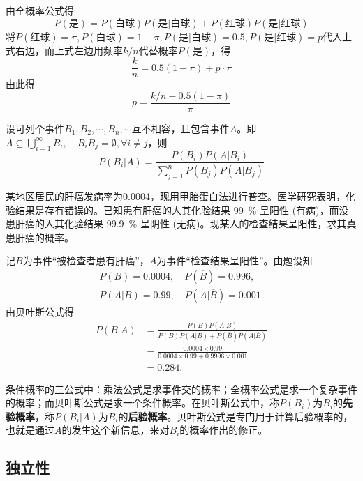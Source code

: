 由全概率公式得
\[ P(\text{是}) = P(\text{白球}) P(\text{是} | \text{白球}) + P(\text{红球}) P(\text{是} | \text{红球}) \]
将$P(\text{红球}) = \pi, P(\text{白球}) = 1-\pi, P(\text{是} | \text{白球}) = 0.5, P(\text{是} | \text{红球}) = p$代入上式右边，而上式左边用频率$k/n$代替概率$P (\text{是})$，得
\[ \frac{k}{n} = 0.5 (1 - \pi) + p \cdot \pi \]
由此得
\[ p = \frac{k/n - 0.5(1 - \pi)}{\pi} \]

\begin{theorem}[Bayes定理]\label{thm:Bayes_Theorem}
    设可列个事件$B_1, B_2, \cdots, B_n, \cdots$互不相容，且包含事件$A$。即$A \subseteq \bigcup_{i=1}^{\infty} B_i,\quad  B_i B_j= \emptyset, \forall i \neq j$，则
    \[ P(B_i | A) = \frac{P(B_i) P(A|B_i)}{\sum_{j=1}^n P(B_j) P(A|B_j)} \]
\end{theorem}

\begin{example}
    某地区居民的肝癌发病率为\num{0.0004}，现用甲胎蛋白法进行普查。医学研究表明，化验结果是存有错误的。已知患有肝癌的人其化验结果 \SI{99}{\percent} 呈阳性 (有病)，而没患肝癌的人其化验结果 \SI{99.9}{\percent} 呈阴性 (无病)。现某人的检查结果呈阳性，求其真患肝癌的概率。
\end{example}
\begin{solution}
    记$B$为事件“被检查者患有肝癌”，$A$为事件“检查结果呈阳性”。由题设知
    \begin{gather*}
        P(B) = 0.0004, \quad P(\overline{B}) = 0.996,\\
        P(A|B) = 0.99, \quad P(A|\overline{B}) = 0.001.
    \end{gather*}
    由贝叶斯公式得
    \begin{align*}
        P(B|A) & = \frac{P(B) P(A|B)}{P(B) P(A|B) + P(\overline{B}) P(A|\overline{B})} \\
               & = \frac{0.0004 \times 0.99}{0.0004 \times 0.99 + 0.9996 \times 0.001} \\
               & = 0.284.
    \end{align*}
\end{solution}

条件概率的三公式中：乘法公式是求事件交的概率；全概率公式是求一个复杂事件的概率；而贝叶斯公式是求一个条件概率。在贝叶斯公式中，称$P(B_i)$为$B_i$的\textbf{先验概率}，称$P(B_i |A)$为$B_i$的\textbf{后验概率}。贝叶斯公式是专门用于计算后验概率的，也就是通过$A$的发生这个新信息，来对$B_i$的概率作出的修正。

\subsection{独立性}

